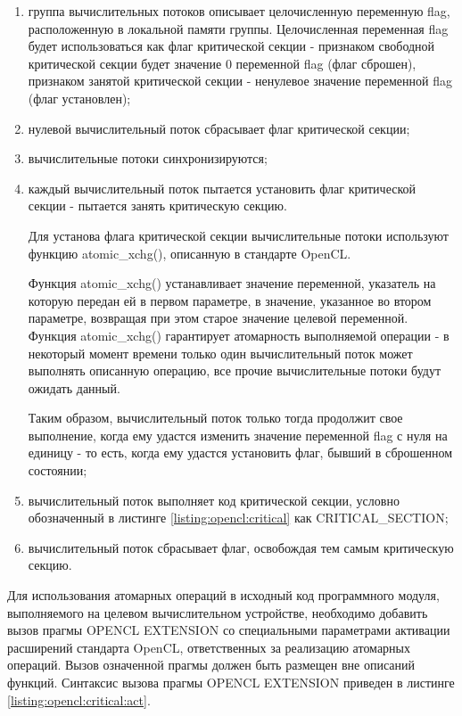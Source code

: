 	\begin{enumerate}

		\item группа вычислительных потоков описывает целочисленную переменную flag, расположенную в локальной памяти группы. Целочисленная переменная flag будет использоваться как флаг критической секции - признаком свободной критической секции будет значение 0 переменной flag (флаг сброшен), признаком занятой критической секции - ненулевое значение переменной flag (флаг установлен);
		\item нулевой вычислительный поток сбрасывает флаг критической секции;
		\item вычислительные потоки синхронизируются;
		\item каждый вычислительный поток пытается установить флаг критической секции - пытается занять критическую секцию.

			Для установа флага критической секции вычислительные потоки используют функцию atomic\_xchg(), описанную в стандарте OpenCL.

			Функция atomic\_xchg() устанавливает значение переменной, указатель на которую передан ей в первом параметре, в значение, указанное во втором параметре, возвращая при этом старое значение целевой переменной. Функция atomic\_xchg() гарантирует атомарность выполняемой операции - в некоторый момент времени только один вычислительный поток может выполнять описанную операцию, все прочие вычислительные потоки будут ожидать данный.

			Таким образом, вычислительный поток только тогда продолжит свое выполнение, когда ему удастся изменить значение переменной flag с нуля на единицу - то есть, когда ему удастся установить флаг, бывший в сброшенном состоянии;

		\item вычислительный поток выполняет код критической секции, условно обозначенный в листинге \ref{listing:opencl:critical} как CRITICAL\_SECTION;
		\item вычислительный поток сбрасывает флаг, освобождая тем самым критическую секцию.

	\end{enumerate}

	Для использования атомарных операций в исходный код программного модуля, выполняемого на целевом вычислительном устройстве, необходимо добавить вызов прагмы OPENCL EXTENSION со специальными параметрами активации расширений стандарта OpenCL, ответственных за реализацию атомарных операций. Вызов означенной прагмы должен быть размещен вне описаний функций. Синтаксис вызова прагмы OPENCL EXTENSION приведен в листинге \ref{listing:opencl:critical:act}.

